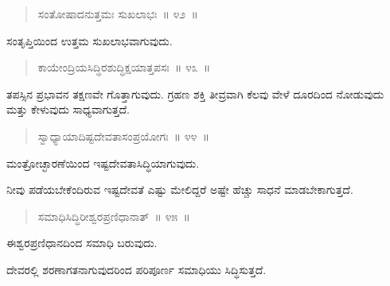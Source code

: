 \vspace{-0.35cm}

\begin{verse}
ಸಂತೋಷಾದನುತ್ತಮಃ ಸುಖಲಾಭಃ~॥ ೪೨~॥
\end{verse}

\vspace{-0.35cm}

ಸಂತೃಪ್ತಿಯಿಂದ ಉತ್ತಮ ಸುಖಲಾಭವಾಗುವುದು. 


\vspace{-0.35cm}

\begin{verse}
ಕಾಯೇಂದ್ರಿಯಸಿದ್ಧಿರಶುದ್ಧಿಕ್ಷಯಾತ್ತಪಸಃ~॥ ೪೩~॥
\end{verse}

\vspace{-0.35cm}

ತಪಸ್ಸಿನ ಪ್ರಭಾವನ ತಕ್ಷಣವೇ ಗೊತ್ತಾಗುವುದು. ಗ್ರಹಣ ಶಕ್ತಿ ತೀವ್ರವಾಗಿ ಕೆಲವು ವೇಳೆ ದೂರದಿಂದ ನೋಡುವುದು ಮತ್ತು ಕೇಳುವುದು ಸಾಧ್ಯವಾಗುತ್ತದೆ. 

\vspace{-0.35cm}

\begin{verse}
ಸ್ವಾಧ್ಯಾಯಾದಿಷ್ಟದೇವತಾಸಂಪ್ರಯೋಗಃ~॥ ೪೪~॥
\end{verse}

\vspace{-0.35cm}

ಮಂತ್ರೋಚ್ಛಾರಣೆಯಿಂದ ಇಷ್ಟದೇವತಾಸಿದ್ಧಿಯಾಗುವುದು. 

ನೀವು ಪಡೆಯಬೇಕೆಂದಿರುವ ಇಷ್ಟದೇವತೆ ಎಷ್ಟು ಮೇಲಿದ್ದರೆ ಅಷ್ಟೇ ಹೆಚ್ಚು ಸಾಧನೆ ಮಾಡಬೇಕಾಗುತ್ತದೆ. 

\vspace{-0.35cm}

\begin{verse}
ಸಮಾಧಿಸಿದ್ಧಿರೀಶ್ವರಪ್ರಣಿಧಾನಾತ್​~॥ ೪೫~॥
\end{verse}

\vspace{-0.35cm}

ಈಶ್ವರಪ್ರಣಿಧಾನದಿಂದ ಸಮಾಧಿ ಬರುವುದು. 

ದೇವರಲ್ಲಿ ಶರಣಾಗತನಾಗುವುದರಿಂದ ಪರಿಪೂರ್ಣ ಸಮಾಧಿಯು ಸಿದ್ಧಿಸುತ್ತದೆ. 

\eject

\vspace{-0.35cm}

